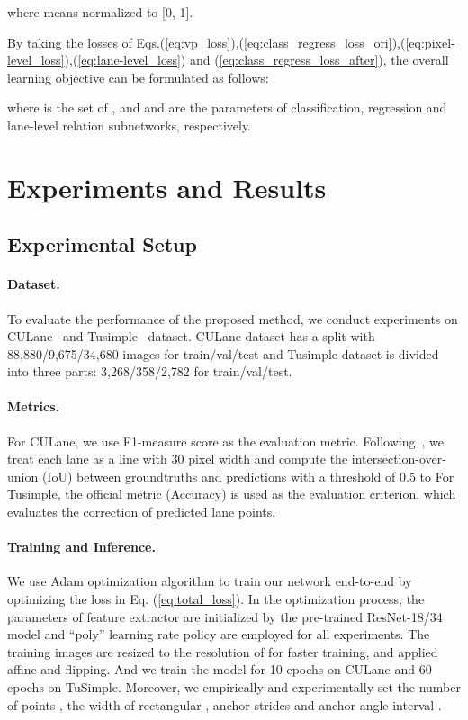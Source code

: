 \documentclass{article}
\begin{document}
where  means normalized to [0, 1].

By taking the losses of Eqs.(\ref{eq:vp_loss}),(\ref{eq:class_regress_loss_ori}),(\ref{eq:pixel-level_loss}),(\ref{eq:lane-level_loss}) and (\ref{eq:class_regress_loss_after}), the overall learning objective can be formulated as follows:

where  is the set of , and  and  are the parameters of classification, regression and lane-level relation subnetworks, respectively.

\section{Experiments and Results}
\subsection{Experimental Setup}

\paragraph{Dataset.}
To evaluate the performance of the proposed method, we conduct experiments on CULane~\cite{pan2018spatial} and Tusimple~\cite{tusimple} dataset. CULane dataset has a split with 88,880/9,675/34,680 images for train/val/test and Tusimple dataset is divided into three parts: 3,268/358/2,782 for train/val/test.

\paragraph{Metrics.}
For CULane, we use F1-measure score as the evaluation metric. Following~\cite{pan2018spatial}, we treat each lane as a line with 30 pixel width and compute the intersection-over-union (IoU) between groundtruths and predictions with a threshold of 0.5 to 
For Tusimple, the official metric (Accuracy) is used as the evaluation criterion, which evaluates the correction of predicted lane points.

\paragraph{Training and Inference.}
We use Adam optimization algorithm to train our network end-to-end by optimizing the loss in Eq. (\ref{eq:total_loss}). In the optimization process, the parameters of feature extractor are initialized by the pre-trained ResNet-18/34 model and ``poly'' learning rate policy are employed for all experiments. The training images are resized to the resolution of  for faster training, and applied affine and flipping. And we train the model for 10 epochs on CULane and 60 epochs on TuSimple.  Moreover, we empirically and experimentally set the number of points , the width of rectangular , anchor strides  and anchor angle interval .
\end{document}
